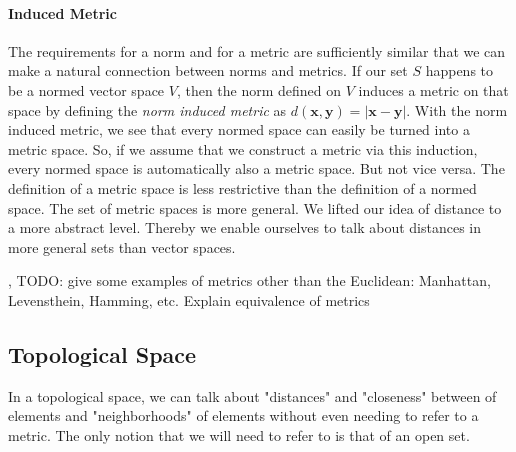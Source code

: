 \paragraph{Induced Metric}
The requirements for a norm and for a metric are sufficiently similar that we can make a natural connection between norms and metrics. If our set $S$ happens to be a normed vector space $V$, then the norm defined on $V$ induces a metric on that space by defining the \emph{norm induced metric} as $d(\mathbf{x, y}) = |\mathbf{x-y}|$. With the norm induced metric, we see that every normed space can easily be turned into a metric space. So, if we assume that we construct a metric via this induction, every normed space is automatically also a metric space. But not vice versa. The definition of a metric space is less restrictive than the definition of a normed space. The set of metric spaces is more general. We lifted our idea of distance to a more abstract level. Thereby we enable ourselves to talk about distances in more general sets than vector spaces.

\medskip
[Q: Can we turn this around by saying that a metric induces a norm by defining the norm as distance from the origin $|\mathbf{x}| = d (\mathbf{x, 0})$ whenever our set happens to have some special element $\mathbf{0}$ that we call the origin?], TODO: give some examples of metrics other than the Euclidean: Manhattan, Levensthein, Hamming, etc. Explain equivalence of metrics














\subsection{Topological Space}
In a topological space, we can talk about "distances" and "closeness" between of elements and "neighborhoods" of elements without even needing to refer to a metric. The only notion that we will need to refer to is that of an open set.

